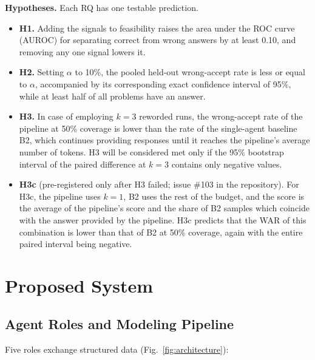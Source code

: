\documentclass[conference]{IEEEtran}
\begin{document}
\textbf{Hypotheses.} Each RQ has one testable prediction.
\begin{itemize}
\item \textbf{H1.} Adding the signals to feasibility raises the area under the ROC curve (AUROC) for separating correct
from wrong answers by at least 0.10, and removing any one signal lowers it.
\item \textbf{H2.} Setting $\alpha$ to 10\%, the pooled held-out wrong-accept rate is less or equal to $\alpha$,
accompanied by its corresponding exact confidence interval of 95\%, while at least half of all problems have an answer.
\item \textbf{H3.} In case of employing $k = 3$ reworded runs, the wrong-accept rate of the pipeline at 50\% coverage
is lower than the rate of the single-agent baseline B2, which continues providing responses until it reaches the
pipeline's average number of tokens. H3 will be considered met only if the 95\% bootstrap interval of the paired difference at $k = 3$
contains only negative values.
\item \textbf{H3c} (pre-registered only after H3 failed; issue \#103 in the repository). For H3c, the pipeline uses
$k = 1$, B2 uses the rest of the budget, and the score is the average of the pipeline's score and the share of B2
samples which coincide with the answer provided by the pipeline. H3c predicts that the WAR of this combination is lower
than that of B2 at 50\% coverage, again with the entire paired interval being negative.
\end{itemize}

\section{Proposed System}
\label{sec:system}

\subsection{Agent Roles and Modeling Pipeline}
Five roles exchange structured data (Fig.~\ref{fig:architecture}):
\end{document}
